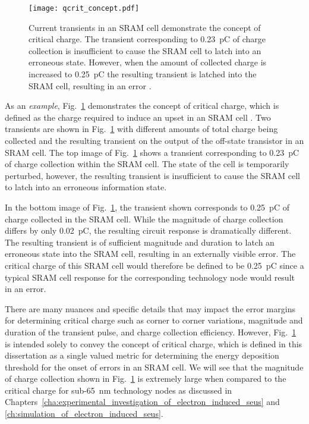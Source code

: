 \begin{figure}[htbp]
    \begin{center}
        \texttt{[image: qcrit\_concept.pdf]}
    \end{center}
    \caption[Current transients in an SRAM cell demonstrate the concept of critical charge. The transient corresponding to 0.23~pC of charge collection is insufficient to cause the SRAM cell to latch into an erroneous state. However, when the amount of collected charge is increased to 0.25~pC the resulting transient is latched into the SRAM cell, resulting in an error.]{Current transients in an SRAM cell demonstrate the concept of critical charge. The transient corresponding to 0.23~pC of charge collection is insufficient to cause the SRAM cell to latch into an erroneous state. However, when the amount of collected charge is increased to 0.25~pC the resulting transient is latched into the SRAM cell, resulting in an error \cite{massengill:1993sc}.}
    \label{fig:qcrit_concept}
\end{figure}

As an \emph{example}, Fig.~\ref{fig:qcrit_concept} demonstrates the concept of critical charge, which is defined as the charge required to induce an upset in an SRAM cell \cite{massengill:1993sc}.
Two transients are shown in Fig.~\ref{fig:qcrit_concept} with different amounts of total charge being collected and the resulting transient on the output of the off-state transistor in an SRAM cell.
The top image of Fig.~\ref{fig:qcrit_concept} shows a transient corresponding to 0.23~pC of charge collection within the SRAM cell.
The state of the cell is temporarily perturbed, however, the resulting transient is insufficient to cause the SRAM cell to latch into an erroneous information state.

In the bottom image of Fig.~\ref{fig:qcrit_concept}, the transient shown corresponds to 0.25~pC of charge collected in the SRAM cell. 
While the magnitude of charge collection differs by only 0.02~pC, the resulting circuit response is dramatically different. 
The resulting transient is of sufficient magnitude and duration to latch an erroneous state into the SRAM cell, resulting in an externally visible error.
The critical charge of this SRAM cell would therefore be defined to be 0.25~pC since a typical SRAM cell response for the corresponding technology node  would result in an error.

There are many nuances and specific details that may impact the error margins for determining critical charge such as corner to corner variations, magnitude and duration of the transient pulse, and charge collection efficiency. 
However, Fig.~\ref{fig:qcrit_concept} is intended solely to convey the concept of critical charge, which is defined in this dissertation as a single valued metric for determining the energy deposition threshold for the onset of errors in an SRAM cell.
We will see that the magnitude of charge collection shown in Fig.~\ref{fig:qcrit_concept} is extremely large when compared to the critical charge for sub-65~nm technology nodes as discussed in Chapters~\ref{cha:experimental_investigation_of_electron_induced_seus} and \ref{ch:simulation_of_electron_induced_seus}.

